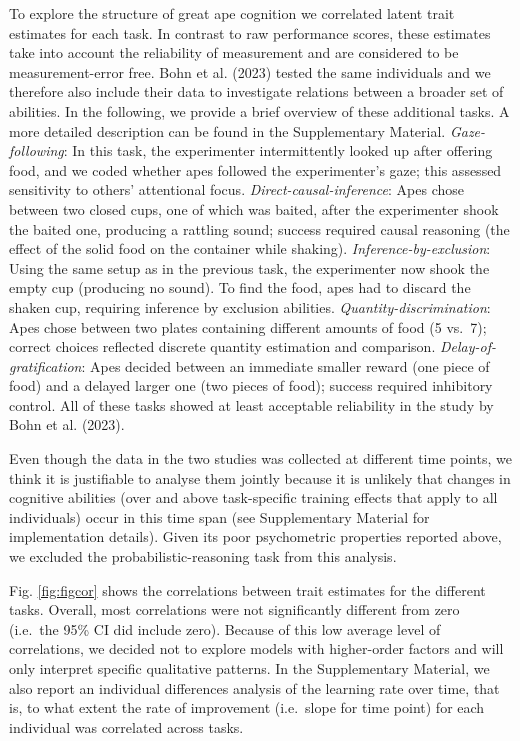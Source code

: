 \documentclass[
  man,floatsintext]{apa6}
\begin{document}
To explore the structure of great ape cognition we correlated latent trait estimates for each task. In contrast to raw performance scores, these estimates take into account the reliability of measurement and are considered to be measurement-error free. Bohn et al. (2023) tested the same individuals and we therefore also include their data to investigate relations between a broader set of abilities. In the following, we provide a brief overview of these additional tasks. A more detailed description can be found in the Supplementary Material. \emph{Gaze-following}: In this task, the experimenter intermittently looked up after offering food, and we coded whether apes followed the experimenter's gaze; this assessed sensitivity to others' attentional focus. \emph{Direct-causal-inference}: Apes chose between two closed cups, one of which was baited, after the experimenter shook the baited one, producing a rattling sound; success required causal reasoning (the effect of the solid food on the container while shaking). \emph{Inference-by-exclusion}: Using the same setup as in the previous task, the experimenter now shook the empty cup (producing no sound). To find the food, apes had to discard the shaken cup, requiring inference by exclusion abilities. \emph{Quantity-discrimination}: Apes chose between two plates containing different amounts of food (5 vs.~7); correct choices reflected discrete quantity estimation and comparison. \emph{Delay-of-gratification}: Apes decided between an immediate smaller reward (one piece of food) and a delayed larger one (two pieces of food); success required inhibitory control. All of these tasks showed at least acceptable reliability in the study by Bohn et al. (2023).

Even though the data in the two studies was collected at different time points, we think it is justifiable to analyse them jointly because it is unlikely that changes in cognitive abilities (over and above task-specific training effects that apply to all individuals) occur in this time span (see Supplementary Material for implementation details). Given its poor psychometric properties reported above, we excluded the probabilistic-reasoning task from this analysis.

Fig. \ref{fig:figcor} shows the correlations between trait estimates for the different tasks. Overall, most correlations were not significantly different from zero (i.e.~the 95\% CI did include zero). Because of this low average level of correlations, we decided not to explore models with higher-order factors and will only interpret specific qualitative patterns. In the Supplementary Material, we also report an individual differences analysis of the learning rate over time, that is, to what extent the rate of improvement (i.e.~slope for time point) for each individual was correlated across tasks.
\end{document}
